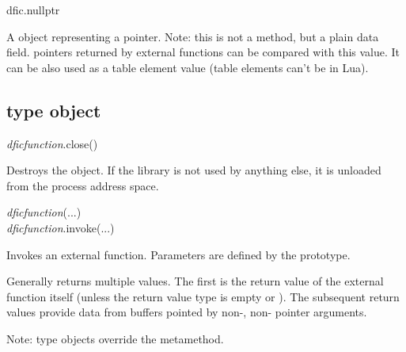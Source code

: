 \documentclass[a4paper,12pt,twoside,extrafontsizes]{memoir}
\begin{document}
\begin{luafuncprototype}
dfic.nullptr
\end{luafuncprototype}

\begin{funcdescr}
	A  object representing a  pointer. Note: this is not a method, but a plain data field.  pointers returned by external functions can be compared with this value. It can be also used as a table element value (table elements can't be  in Lua).
\end{funcdescr}

\subsection{ type object}


\begin{luafuncprototype}
\emph{dficfunction}.close()
\end{luafuncprototype}

\begin{funcdescr}
	Destroys the object. If the library is not used by anything else, it is  unloaded from the process address space.
\end{funcdescr}


\begin{luafuncprototype}
\emph{dficfunction}(...) \\
\emph{dficfunction}.invoke(...)
\end{luafuncprototype}

\begin{funcdescr}
	Invokes an external function. Parameters are defined by the prototype.
\end{funcdescr}

\begin{funcret}
	Generally returns multiple values. The first is the return value of the external function itself (unless the return value type is empty or ). The subsequent return values provide data from buffers pointed by non-, non- pointer arguments.
\end{funcret}

\begin{funcremarks}
	Note:  type objects override the  metamethod.
\end{funcremarks}
\end{document}
